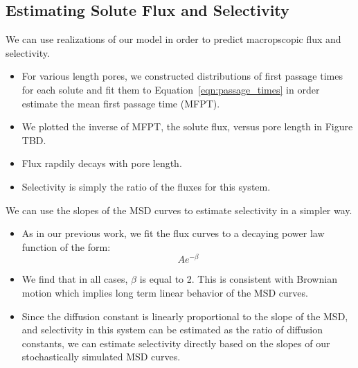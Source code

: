 \documentclass{article}
\begin{document}
  
  \subsection{Estimating Solute Flux and Selectivity}  
  

  We can use realizations of our model in order to predict macropscopic flux and
  selectivity.
  \begin{itemize}
    \item For various length pores, we constructed distributions of first passage times for each solute and
    fit them to Equation~\ref{eqn:passage_times} in order estimate the mean 
    first passage time (MFPT). 
    \item We plotted the inverse of MFPT, the solute flux, versus pore length
    in Figure TBD.
    \item Flux rapdily decays with pore length.
    \item Selectivity is simply the ratio of the fluxes for this system.
  \end{itemize}

  We can use the slopes of the MSD curves to estimate selectivity in a simpler way.
  \begin{itemize}
  	\item As in our previous work, we fit the flux curves to a decaying power law function
  	of the form:
  	\begin{equation}
    	Ae^{-\beta}
  	\end{equation}
  	\item We find that in all cases, $\beta$ is equal to 2. This is consistent with Brownian
	motion which implies long term linear behavior of the MSD curves. 
	\item Since the diffusion constant is linearly proportional to the slope of the MSD, and 
	selectivity in this system can be estimated as the ratio of diffusion constants, we can 
	estimate selectivity directly based on the slopes of our stochastically simulated MSD curves.
  \end{itemize}
  
\end{document}
